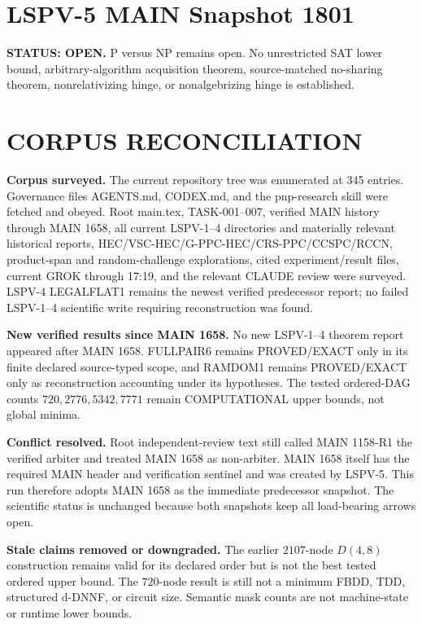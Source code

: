 \documentclass[11pt]{article}
\begin{document}
\section*{LSPV-5 MAIN Snapshot 1801}
\textbf{STATUS: OPEN.} P versus NP remains open. No unrestricted SAT lower bound, arbitrary-algorithm acquisition theorem, source-matched no-sharing theorem, nonrelativizing hinge, or nonalgebrizing hinge is established.

\section*{CORPUS RECONCILIATION}
\textbf{Corpus surveyed.} The current repository tree was enumerated at 345 entries. Governance files AGENTS.md, CODEX.md, and the pnp-research skill were fetched and obeyed. Root main.tex, TASK-001--007, verified MAIN history through MAIN 1658, all current LSPV-1--4 directories and materially relevant historical reports, HEC/VSC-HEC/G-PPC-HEC/CRS-PPC/CCSPC/RCCN, product-span and random-challenge explorations, cited experiment/result files, current GROK through 17:19, and the relevant CLAUDE review were surveyed. LSPV-4 LEGALFLAT1 remains the newest verified predecessor report; no failed LSPV-1--4 scientific write requiring reconstruction was found.

\textbf{New verified results since MAIN 1658.} No new LSPV-1--4 theorem report appeared after MAIN 1658. FULLPAIR6 remains PROVED/EXACT only in its finite declared source-typed scope, and RAMDOM1 remains PROVED/EXACT only as reconstruction accounting under its hypotheses. The tested ordered-DAG counts \(720,2776,5342,7771\) remain COMPUTATIONAL upper bounds, not global minima.

\textbf{Conflict resolved.} Root independent-review text still called MAIN 1158-R1 the verified arbiter and treated MAIN 1658 as non-arbiter. MAIN 1658 itself has the required MAIN header and verification sentinel and was created by LSPV-5. This run therefore adopts MAIN 1658 as the immediate predecessor snapshot. The scientific status is unchanged because both snapshots keep all load-bearing arrows open.

\textbf{Stale claims removed or downgraded.} The earlier \(2107\)-node \(D(4,8)\) construction remains valid for its declared order but is not the best tested ordered upper bound. The \(720\)-node result is still not a minimum FBDD, TDD, structured d-DNNF, or circuit size. Semantic mask counts are not machine-state or runtime lower bounds.
\end{document}
